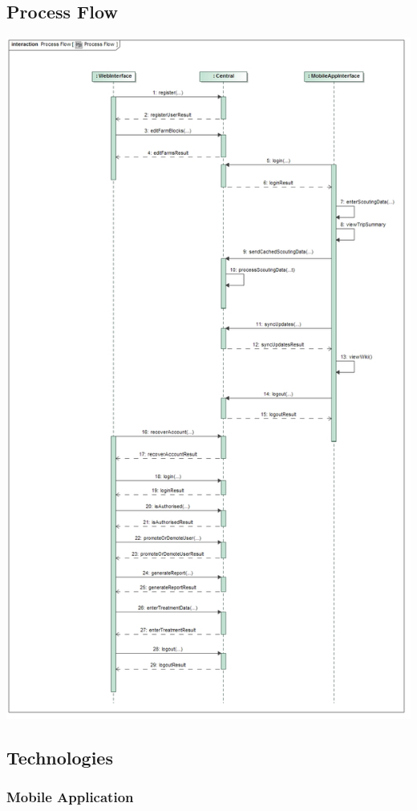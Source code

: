\documentclass[11pt,a4paper,titlepage]{article}
\begin{document}
	\subsection{Process Flow}
	\begin{center}
		\includegraphics[scale=0.4]{ProcessFlow}	
	\end{center}
	\subsection{Technologies}
		\subsubsection{Mobile Application}
\end{document}
